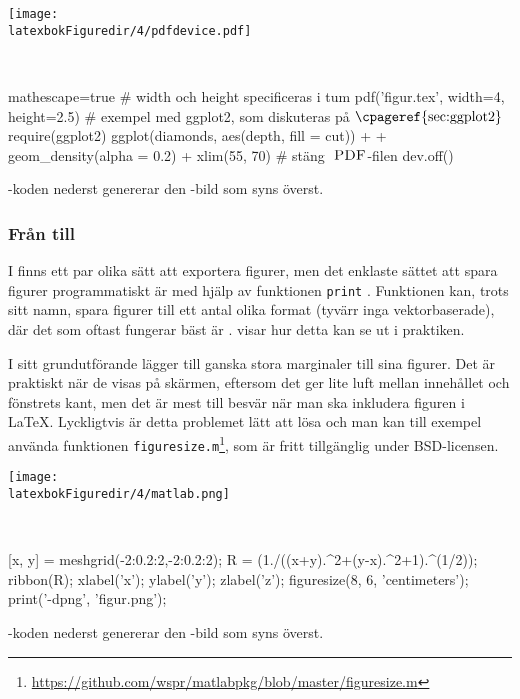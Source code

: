 \documentclass[10pt,../../a4.tex]{subfiles}
\begin{document}
\begin{kod}[p]
	\centering
	\begin{minipage}{\textwidth}
		\centering
		\texttt{[image: \\latexbokFiguredir/4/pdfdevice.pdf]}
	\end{minipage}
	\\[1ex]
	\begin{minipage}{\textwidth}
		\begin{rcode*}{mathescape=true}
# width och height specificeras i tum
pdf('figur.tex', width=4, height=2.5)
# exempel med ggplot2, som diskuteras på $\text{\cpageref{sec:ggplot2}}$
require(ggplot2)
ggplot(diamonds, aes(depth, fill = cut)) +
  + geom_density(alpha = 0.2) + xlim(55, 70)
# stäng $\text{\PDF}$-filen
dev.off()
		\end{rcode*}
	\end{minipage}
	\caption{\Rlogo-koden nederst genererar den \PDF-bild som
	syns överst.}
	\label{ex:pdfdevice}
\end{kod}

\subsubsection{Från \MATLAB till \PNG}
I \MATLAB finns ett par olika sätt att exportera figurer, men det
enklaste sättet att spara figurer programmatiskt är med hjälp av 
funktionen \texttt{print} \parencite{MATLAB13:print}. Funktionen kan,
trots sitt namn, spara figurer till ett antal olika format (tyvärr inga
vektorbaserade), där det som oftast fungerar bäst är \PNG.
 visar hur detta kan se ut i praktiken.

I sitt grundutförande lägger \MATLAB till ganska stora marginaler till
sina figurer. Det är praktiskt när de visas på skärmen, eftersom det ger
lite luft mellan innehållet och fönstrets kant, men det är mest till
besvär när man ska inkludera figuren i \LaTeX. Lyckligtvis är detta
problemet lätt att lösa \parencite{Robertson10} och man kan till exempel
använda funktionen \texttt{figuresize.m}\footnote{\url{https://github.com/wspr/matlabpkg/blob/master/figuresize.m}}, som är fritt tillgänglig under BSD-licensen.

\begin{kod}[p]
	\centering
	\begin{minipage}{\textwidth}
		\centering
		\texttt{[image: \\latexbokFiguredir/4/matlab.png]}
	\end{minipage}
	\\[2ex]
	\begin{minipage}{\textwidth}
		\begin{matlabcode}
[x, y] = meshgrid(-2:0.2:2,-2:0.2:2);
R = (1./((x+y).^2+(y-x).^2+1).^(1/2));
ribbon(R);
xlabel('x'); ylabel('y'); zlabel('z');
figuresize(8, 6, 'centimeters');
print('-dpng', 'figur.png');
		\end{matlabcode}
	\end{minipage}
	\caption{\MATLAB-koden nederst genererar den \PNG-bild som
	syns överst.}
	\label{ex:matlab:png}
\end{kod}

\label{sec:4:end}
\end{document}
